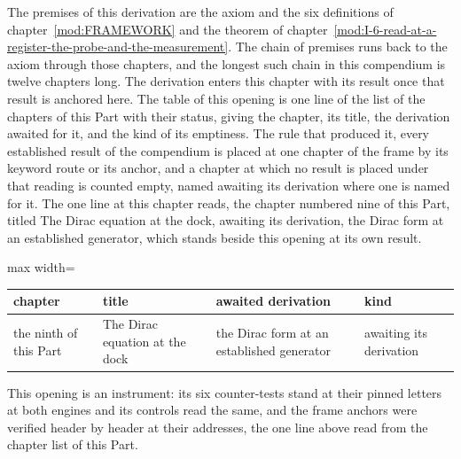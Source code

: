 \begin{chproof}[instrument]
The premises of this derivation are the axiom and the six definitions of chapter~\ref{mod:FRAMEWORK} and the theorem of chapter~\ref{mod:I-6-read-at-a-register-the-probe-and-the-measurement}. The chain of premises runs back to the axiom through those chapters, and the longest such chain in this compendium is twelve chapters long.
The derivation enters this chapter with its result once that result is anchored here.
The table of this opening is one line of the list of the chapters of this Part with their status, giving the chapter, its title, the derivation awaited for it, and the kind of its emptiness. The rule that produced it, every established result of the compendium is placed at one chapter of the frame by its keyword route or its anchor, and a chapter at which no result is placed under that reading is counted empty, named awaiting its derivation where one is named for it. The one line at this chapter reads, the chapter numbered nine of this Part, titled The Dirac equation at the dock, awaiting its derivation, the Dirac form at an established generator, which stands beside this opening at its own result.
\begin{center}\begin{adjustbox}{max width=\linewidth}\begin{tabular}{llll}\hline chapter & title & awaited derivation & kind \\ \hline the ninth of this Part & The Dirac equation at the dock & the Dirac form at an established generator & awaiting its derivation \\ \hline \end{tabular}\end{adjustbox}\end{center}
This opening is an instrument: its six counter-tests stand at their pinned letters at both engines and its controls read the same, and the frame anchors were verified header by header at their addresses, the one line above read from the chapter list of this Part.
\end{chproof}

